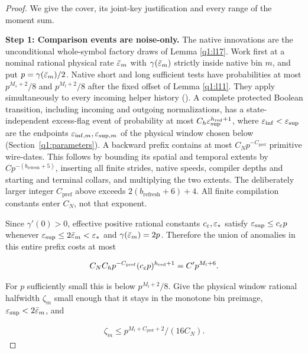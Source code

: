 \begin{proof}
We give the cover, its joint-key justification and every range of the moment sum.

\smallskip\noindent\textbf{Step 1: Comparison events are noise-only.} The native innovations are the unconditional whole-symbol factory draws of Lemma \ref{q1:l17}. Work first at a nominal rational physical rate \(\bar{\varepsilon}_{m}\) with \(\gamma(\bar{\varepsilon}_{m})\) strictly inside native bin \(m\), and put \(p=\gamma(\bar{\varepsilon}_{m})/2\). Native short and long sufficient tests have probabilities at most \(p^{M_{s}+2}/8\) and \(p^{M_{l}+2}/8\) after the fixed offset of Lemma \ref{q1:l11}. They apply simultaneously to every incoming helper history (\cite[Lemma~\ref*{cl:lem:stripes}]{DMNoise1D2026}). A complete protected Boolean transition, including incoming and outgoing normalizations, has a state-independent excess-flag event of probability at most \(C_{h} \varepsilon_{\mathrm{sup}}^{h_{\mathrm{red}}+1}\), where \(\varepsilon_{\mathrm{inf}}<\varepsilon_{\mathrm{sup}}\) are the endpoints \(\varepsilon_{\mathrm{inf},m},\varepsilon_{\mathrm{sup},m}\) of the physical window chosen below (Section~\ref{q1:parameters}). A backward prefix contains at most \(C_{N} p^{-C_{\mathrm{pref}}}\) primitive wire-dates. This follows by bounding its spatial and temporal extents by \(C p^{-(b_{\mathrm{refresh}}+5)}\), inserting all finite strides, native speeds, compiler depths and starting and terminal collars, and multiplying the two extents. The deliberately larger integer \(C_{\mathrm{pref}}\) above exceeds \(2(b_{\mathrm{refresh}}+6)+4\). All finite compilation constants enter \(C_{N}\), not that exponent.


Since \(\gamma'(0)>0\), effective positive rational constants \(c_{\varepsilon},\varepsilon_{*}\) satisfy \(\varepsilon_{\mathrm{sup}}\le c_{\varepsilon} p\) whenever \(\varepsilon_{\mathrm{sup}}\le 2\bar{\varepsilon}_{m}<\varepsilon_{*}\) and \(\gamma(\bar{\varepsilon}_{m})=2p\). Therefore the union of anomalies in this entire prefix costs at most

\[
C_{N} C_{h} p^{-C_{\mathrm{pref}}}(c_{\varepsilon} p)^{h_{\mathrm{red}}+1} = C' p^{M_{l}+6}.
\]

For \(p\) sufficiently small this is below \(p^{M_{l}+2}/8\). Give the physical window rational halfwidth \(\zeta_{m}\) small enough that it stays in the monotone bin preimage, \(\varepsilon_{\mathrm{sup}}<2\bar{\varepsilon}_{m}\), and

\[
\begin{gathered}
\zeta_{m} \le  p^{M_{l}+C_{\mathrm{pref}}+2}/(16 C_{N}).
\end{gathered}
\]


\end{proof}
